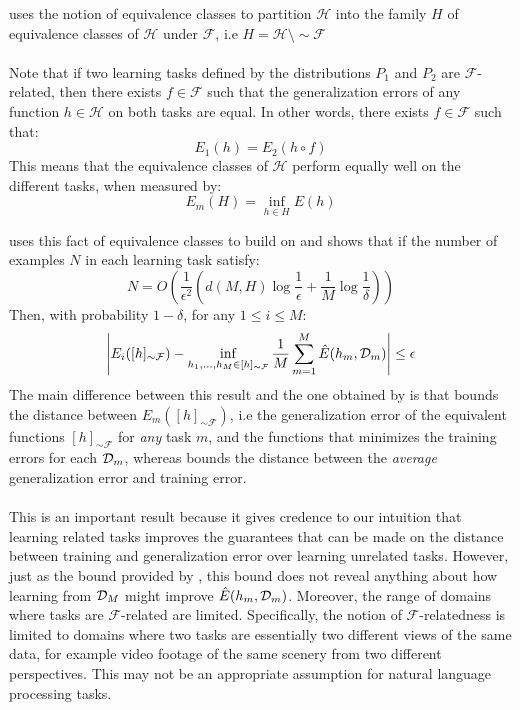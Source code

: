 \citet{ben2003} uses the notion of equivalence classes to partition $\mathcal{H}$ into the family $H$ of equivalence classes of $\mathcal{H}$ under $\mathcal{F}$, i.e $H = \mathcal{H} \setminus \sim \mathcal{F}$
\\\\
Note that if two learning tasks defined by the distributions $P_1$ and $P_2$ are $\mathcal{F}$-related, then there exists $f \in \mathcal{F}$ such that the generalization errors of any function $h \in \mathcal{H}$ on both tasks are equal. In other words, there exists $f \in \mathcal{F}$ such that:
$$
E_1(h) = E_2(h \circ f)
$$
This means that the equivalence classes of $\mathcal{H}$ perform equally well on the different tasks, when measured by:
$$
E_m(H) = \inf\limits_{h \in H}E(h)
$$

\citet{ben2003} uses this fact of equivalence classes to build on \citet{baxter2000} and shows that if the number of examples $N$ in each learning task satisfy:
$$
N = O\left(\frac{1}{\epsilon^2}\left(d(M, H) \log \frac{1}{\epsilon} + \frac{1}{M} \log \frac{1}{\delta}\right)\right)
$$
Then, with probability $1 - \delta$, for any $1 \leq i \leq M$:
$$
\left| E_i([h]_{\sim \mathcal{F}}) - \inf\limits_{h_1,\dots,h_M \in [h]_{\sim \mathcal{F}}} \frac{1}{M}\sum\limits_{m = 1}^M \hat{E}(h_m, \mathcal{D}_m)\right|  \leq \epsilon
$$
The main difference between this result and the one obtained by \citet{baxter2000} is that \citet{ben2003} bounds the distance between $E_m([h]_{\sim \mathcal{F}})$, i.e the generalization error of the equivalent functions $[h]_{\sim \mathcal{F}}$ for \emph{any} task $m$, and the functions that minimizes the training errors for each $\mathcal{D}_m$, whereas \citet{baxter2000} bounds the distance between the \emph{average} generalization error and training error.
\\\\
This is an important result because it gives credence to our intuition that learning related tasks improves the guarantees that can be made on the distance between training and generalization error over learning unrelated tasks. However, just as the bound provided by \citet{baxter2000}, this bound does not reveal anything about how learning from $\mathcal{D}_M$ might improve $\hat{E}(h_m, \mathcal{D}_m)$. Moreover, the range of domains where tasks are $\mathcal{F}$-related are limited. Specifically, the notion of $\mathcal{F}$-relatedness is limited to domains where two tasks are essentially two different views of the same data, for example video footage of the same scenery from two different perspectives. This may not be an appropriate assumption for natural language processing tasks.